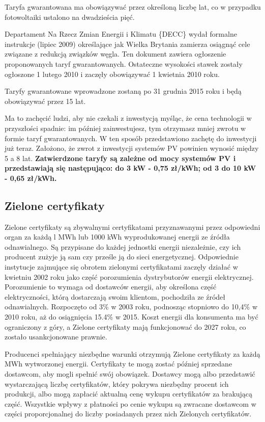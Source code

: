 \documentclass[12pt,a4paper]{article}
\begin{document}
Taryfa gwarantowana ma obowiązywać przez określoną liczbę lat, co w 
przypadku fotowoltaiki ustalono na dwadzieścia pięć.

Departament Na Rzecz Zmian Energii i Klimatu \{DECC\} wydał formalne 
instrukcje (lipiec 2009) określające jak Wielka Brytania zamierza 
osiągnąć cele związane z redukcją związków węgla. Ten dokument zawiera 
ogłoszenie proponowanych taryf gwarantowanych. Ostateczne wysokości 
stawek zostały ogłoszone 1 lutego 2010 i zaczęły obowiązywać 1 kwietnia 
2010 roku.

Taryfy gwarantowane wprowadzone zostaną po 31 grudnia 2015 roku i będą 
obowiązywać przez 15 lat. 

Ma to zachęcić ludzi, aby nie czekali z inwestycją myśląc, że cena 
technologii w przyszłości spadnie: im później zainwestujesz, tym 
otrzymasz mniej zwrotu w formie taryf gwarantowanych. W ten sposób 
przedstawiono zachętę do inwestycji już teraz. Założono, że zwrot z 
inwestycji systemów PV powinien wynosić między 5 a 8 lat. \textbf{Zatwierdzone 
taryfy są zależne od mocy systemów PV i przedstawiają się następująco: 
do 3 kW - 0,75 zł/kWh; od 3 do 10 kW - 0,65 zł/kWh. }

\subsection{Zielone certyfikaty}

Zielone certyfikaty  są zbywalnymi certyfikatami przyznawanymi przez 
odpowiedni organ za każdą l MWh lub 1000 kWh wyprodukowanej energii ze 
źródła odnawialnego. Są przypisane do każdej jednostki energii 
niezależnie, czy ich producent zużyje ją sam czy prześle ją do sieci 
energetycznej. Odpowiednie instytucje zajmujące się obrotem zielonymi 
certyfikatami zaczęły działać w kwietniu 2002 roku jako część 
porozumienia dystrybutorów energii elektrycznej. Porozumienie to wymaga 
od dostawców energii, aby określona część elektryczności, którą 
dostarczają swoim klientom, pochodziła ze źródeł odnawialnych. 
Rozpoczęto od 3\% w 2003 roku, podnosząc stopniowo do 10,4\% w 2010 
roku, aż do osiągnięcia 15.4\% w 2015. Koszt energii dla konsumenta ma 
być ograniczony z góry, a Zielone certyfikaty mają funkcjonować do 2027 
roku, co zostało usankcjonowane prawnie. 

Producenci spełniający niezbędne warunki otrzymują Zielone certyfikaty 
za każdą MWh wytworzonej energii. Certyfikaty te mogą zostać później 
sprzedane dostawcom, aby mogli spełnić swój obowiązek. Dostawcy mogą 
albo przedstawić wystarczającą liczbę certyfikatów, który pokrywa 
niezbędny procent ich produkcji, albo mogą zapłacić aktualną cenę wykupu 
certyfikatów za brakującą część. Wszystkie wpływy z płatności po cenie 
wykupu są zwracane dostawcom w części proporcjonalnej do liczby 
posiadanych przez nich Zielonych certyfikatów. 
\end{document}
